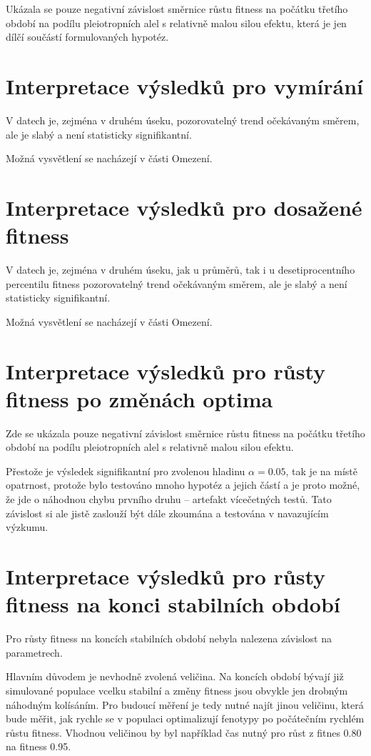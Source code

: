Ukázala se pouze negativní závislost směrnice růstu fitness na počátku třetího období na podílu pleiotropních alel s
relativně malou silou efektu, která je jen dílčí součástí formulovaných hypotéz.

\section{Interpretace výsledků pro vymírání}

V datech je, zejména v druhém úseku, pozorovatelný trend očekávaným směrem, ale je slabý a není statisticky
signifikantní.

Možná vysvětlení se nacházejí v části Omezení.

\section{Interpretace výsledků pro dosažené fitness}

V datech je, zejména v druhém úseku, jak u průměrů, tak i u desetiprocentního percentilu fitness pozorovatelný trend
očekávaným směrem, ale je slabý a není statisticky signifikantní.

Možná vysvětlení se nacházejí v části Omezení.

\section{Interpretace výsledků pro růsty fitness po změnách optima}

Zde se ukázala pouze negativní závislost směrnice růstu fitness na počátku třetího období na podílu pleiotropních alel
s relativně malou silou efektu.

Přestože je výsledek signifikantní pro zvolenou hladinu $\alpha = 0.05$, tak je na místě
opatrnost, protože bylo testováno mnoho hypotéz a jejich částí a je proto možné, že jde o náhodnou chybu prvního
druhu -- artefakt vícečetných testů.
Tato závislost si ale jistě zaslouží být dále zkoumána a testována v navazujícím výzkumu.

\section{Interpretace výsledků pro růsty fitness na konci stabilních období}

Pro růsty fitness na koncích stabilních období nebyla nalezena závislost na parametrech.

Hlavním důvodem je nevhodně zvolená veličina. Na koncích období bývají již simulované populace vcelku stabilní a
změny fitness jsou obvykle jen drobným náhodným kolísáním. Pro budoucí měření je tedy nutné najít jinou veličinu,
která bude měřit, jak rychle se v populaci optimalizují fenotypy po počátečním rychlém růstu fitness. Vhodnou veličinou
by byl například čas nutný pro růst z fitnes 0.80 na fitness 0.95.

